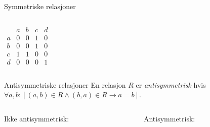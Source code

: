 \begin{frame}[fragile]{Symmetriske relasjoner}
\begin{columns}
\begin{column}{0.3\textwidth}
\begin{math}
                \begin{matrix}
                      & a & b & c & d\\
                    a & 0 & 0 & 1 & 0\\
                    b & 0 & 0 & 1 & 0\\
                    c & 1 & 1 & 0 & 0\\
                    d & 0 & 0 & 0 & 1
                \end{matrix}
            \end{math}
        \end{column}
    \end{columns}
\end{frame}

\begin{frame}[fragile]{Antisymmetriske relasjoner}
    En relasjon $R$ er \emph{antisymmetrisk} hvis $\forall a, b : [(a, b) \in R \land (b, a) \in R \rightarrow a = b]$.\\
    \begin{columns}
        \begin{column}{0.3\textwidth}
            Ikke antisymmetrisk:\\
        \end{column}
        \pause
        \begin{column}{0.3\textwidth}
            Antisymmetrisk:\\
        \end{column}
    \end{columns}

\end{frame}
